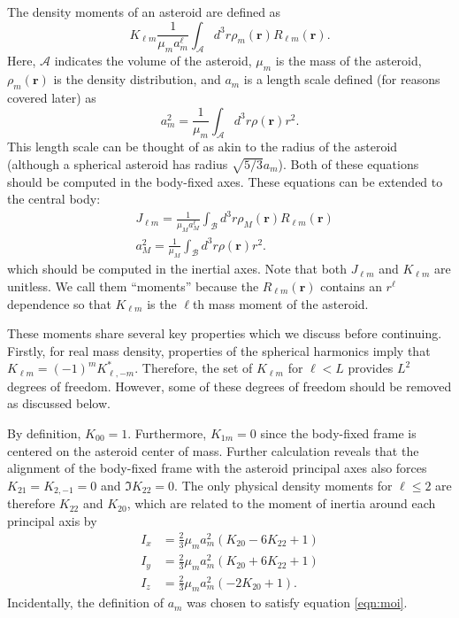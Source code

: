 \documentclass[fleqn,usenatbib]{mnras}
\newcommand{\parens}[1]{\left( #1 \right)}
\begin{document}
The density moments of an asteroid are defined as
\begin{equation}
  K_{\ell m} \frac{1}{\mu_m a_m^\ell} \int_\mathcal{A} d^3 r \rho_m(\bm r) R_{\ell m}(\bm r).
  \label{eqn:klm}
\end{equation}
Here, $\mathcal{A}$ indicates the volume of the asteroid, $\mu_m$ is the mass of the asteroid, $\rho_m(\bm r)$ is the density distribution, and $a_m$ is a length scale defined (for reasons covered later) as 
\begin{equation}
  a_m^2 = \frac{1}{\mu_m} \int_\mathcal{A} d^3 r \rho(\bm r) r^2.
  \label{eqn:am}
\end{equation}
This length scale can be thought of as akin to the radius of the asteroid (although a spherical asteroid has radius $\sqrt{5/3} a_m$).
Both of these equations should be computed in the body-fixed axes. These equations can be extended to the central body:
\begin{equation}
  \begin{split}
    &J_{\ell m} = \frac{1}{\mu_M a_M^\ell} \int_\mathcal{B} d^3 r \rho_M(\bm r) R_{\ell m}(\bm r)\\
    &a_M^2 = \frac{1}{\mu_M} \int_\mathcal{B} d^3 r \rho(\bm r) r^2.
  \label{eqn:jlm}
  \end{split}
\end{equation}
which should be computed in the inertial axes. Note that both $J_{\ell m}$ and $K_{\ell m}$ are unitless. We call them ``moments'' because the $R_{\ell m}(\bm r)$ contains an $r^\ell$ dependence so that $K_{\ell m}$ is the $\ell$th mass moment of the asteroid.

These moments share several key properties which we discuss before continuing. Firstly, for real mass density, properties of the spherical harmonics imply that $K_{\ell m} = (-1)^m K_{\ell, -m}^*$. Therefore, the set of $K_{\ell m}$ for $\ell < L$ provides $L^2$ degrees of freedom. However, some of these degrees of freedom should be removed as discussed below.

By definition, $K_{00}=1$. Furthermore, $K_{1m} = 0$ since the body-fixed frame is centered on the asteroid center of mass. Further calculation reveals that the alignment of the body-fixed frame with the asteroid principal axes also forces $K_{21}=K_{2,-1} = 0$ and $\Im K_{22}=0$. The only physical density moments for $\ell \leq 2$ are therefore $K_{22}$ and $K_{20}$, which are related to the moment of inertia around each principal axis by
\begin{equation}
  \begin{split}
    I_x &= \frac{2}{3}\mu_m a_m^2 \parens{K_{20} - 6 K_{22} + 1}\\
    I_y &= \frac{2}{3}\mu_m a_m^2 \parens{K_{20} + 6 K_{22} + 1}\\
    I_z &= \frac{2}{3}\mu_m a_m^2 \parens{-2K_{20} + 1}.
  \end{split}
  \label{eqn:moi}
\end{equation}
Incidentally, the definition of $a_m$ was chosen to satisfy equation \ref{eqn:moi}.
\end{document}

